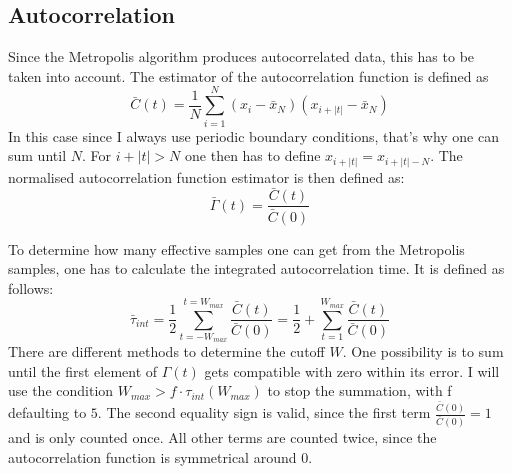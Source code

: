 \documentclass{scrartcl}
\begin{document}
	\subsection{Autocorrelation}
		Since the Metropolis algorithm produces autocorrelated data, this has to be taken into account.
		The estimator of the autocorrelation function is defined as
		\begin{equation}
			\bar C(t) = \frac 1{N} \sum_{i = 1}^{N} (x_i - \bar x_N)(x_{i + |t|} - \bar x_N)
			\label{eq:autocorrelation}
		\end{equation}
		In this case since I always use periodic boundary conditions, that's why one can sum until $N$.
		For $i + |t| > N$ one then has to define $x_{i + |t|} = x_{i + |t| - N}$.
		The normalised autocorrelation function estimator is then defined as:
		\begin{equation}
			\bar\Gamma(t) = \frac {\bar C(t)}{\bar C(0)}
			\label{eq:normalised_autocorrelation}
		\end{equation}

		To determine how many effective samples one can get from the Metropolis samples, one has to calculate the integrated autocorrelation time.
		It is defined as follows:
		\begin{equation}
			\bar \tau_{int} = \frac 12 \sum_{t = -W_{max}}^{t = W_{max}} \frac {\bar C(t)}{\bar C(0)} = \frac 12 + \sum_{t = 1}^{W_{max}} \frac {\bar C(t)}{\bar C(0)}
			\label{eq:integrated_autocorrelation}
		\end{equation}
		There are different methods to determine the cutoff $W$.
		One possibility is to sum until the first element of $\Gamma(t)$ gets compatible with zero within its error.
		I will use the condition $W_{max} > f \cdot \tau_{int}(W_{max})$ to stop the summation, with f defaulting to $5$.
		The second equality sign is valid, since the first term $\frac {\bar C(0)}{\bar C(0)} = 1$ and is only counted once.
		All other terms are counted twice, since the autocorrelation function is symmetrical around 0.
\end{document}
